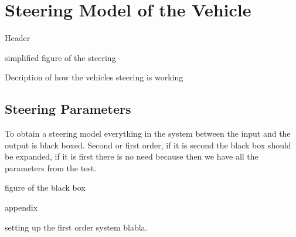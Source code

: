 \section{Steering Model of the Vehicle}\label{sec:SteeringModel}
Header

simplified figure of the steering

Decription of how the vehicles steering is working

\subsection{Steering Parameters}
 To obtain a steering model everything in the system between the input and the output is black boxed. Second or first order, if it is second the black box should be expanded, if it is first there is no need because then we have all the parameters from the test.
 
 figure of the black box
 
 appendix
 
setting up the first order system blabla. 
